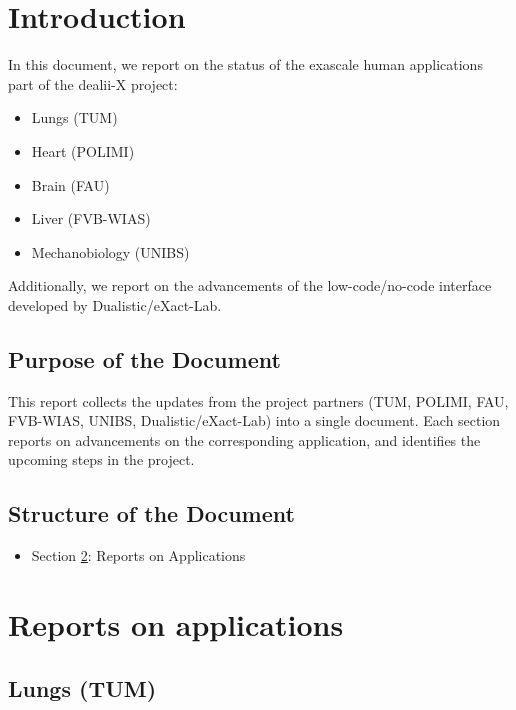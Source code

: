 \documentclass[a4paper,12pt]{article}
\begin{document}
\vspace*{2cm}

\disclaimer

\newpage

\tableofcontents %

\newpage

\section{{Introduction}}

In this document, we report on the status of the exascale human applications part of the dealii-X project:
\begin{itemize}
    \item Lungs (TUM)
    \item Heart (POLIMI)
    \item Brain (FAU)
    \item Liver (FVB-WIAS)
    \item Mechanobiology (UNIBS)
\end{itemize}
Additionally, we report on the advancements of the low-code/no-code interface developed by Dualistic/eXact-Lab.

\subsection{{Purpose of the Document}}

This report collects the updates from the project partners (TUM, POLIMI, FAU, FVB-WIAS, UNIBS, Dualistic/eXact-Lab) into a single document. Each section reports on advancements on the corresponding application, and identifies the upcoming steps in the project.

\subsection{{Structure of the Document}}
\begin{itemize}
    \item Section \ref{sec:section2}: Reports on Applications
\end{itemize}

\newpage

\section{{Reports on applications}}
\label{sec:section2}

\subsection{Lungs (TUM)}
\end{document}
